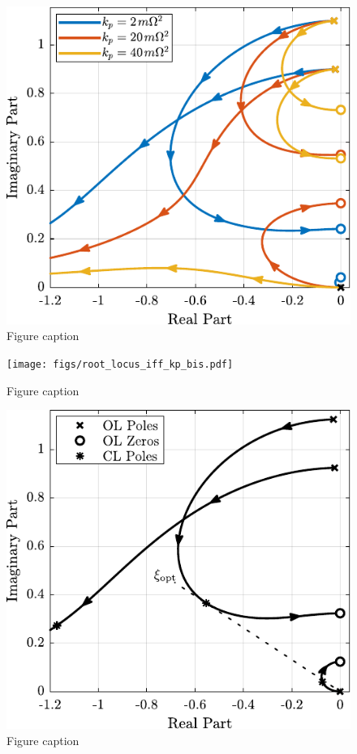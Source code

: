 \documentclass{ISMA_USD2020}
\begin{document}
\begin{figure}[htbp]
\centering
\includegraphics[scale=1]{figs/root_locus_iff_kps.pdf}
\caption{\label{fig:root_locus_iff_kps}Figure caption}
\end{figure}

\begin{figure}[htbp]
\centering
\texttt{[image: figs/root\_locus\_iff\_kp\_bis.pdf]}
\caption{\label{fig:root_locus_iff_kp_bis}Figure caption}
\end{figure}

\begin{figure}[htbp]
\centering
\includegraphics[scale=1]{figs/root_locus_opt_gain_iff_kp.pdf}
\caption{\label{fig:root_locus_opt_gain_iff_kp}Figure caption}
\end{figure}
\end{document}
